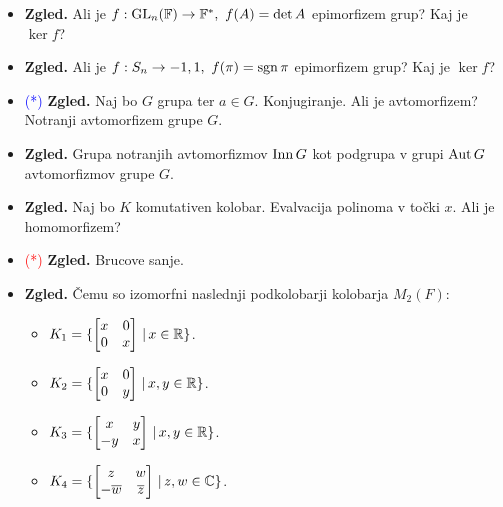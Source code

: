 \begin{enumerate}
\begin{itemize}
        \item \textbf{Zgled.} Ali je \(f: \operatorname{GL}_n(\mathbb{F}) \to \mathbb{F}^*, \ f(A) = \det A\) epimorfizem grup? Kaj je \(\ker f\)? 
        \item \textbf{Zgled.} Ali je \(f: S_n \to {-1, 1}, \ f(\pi) = \operatorname{sgn} \pi\) epimorfizem grup? Kaj je \(\ker f\)?
        \item \textcolor{blue}{(*)} \textbf{Zgled.} Naj bo \(G\) grupa ter \(a \in G\). Konjugiranje. Ali je avtomorfizem? Notranji avtomorfizem grupe \(G\).
        \item \textbf{Zgled.} Grupa notranjih avtomorfizmov \(\operatorname{Inn} G\) kot podgrupa v grupi \(\operatorname{Aut} G\) avtomorfizmov grupe \(G\). 
        \item \textbf{Zgled.} Naj bo \(K\) komutativen kolobar. Evalvacija polinoma v točki \(x\). Ali je homomorfizem?
        \item \textcolor{red}{(*)} \textbf{Zgled.} Brucove sanje.
        \item \textbf{Zgled.} Čemu so izomorfni naslednji podkolobarji kolobarja $M_2(F)$:
        \begin{itemize}
            \item $K_1 = \{\begin{bmatrix}
            x & 0 \\ 0 & x
            \end{bmatrix} \,|\, x \in \mathbb{R}\}$.
            \item $K_2 = \{\begin{bmatrix}
            x & 0 \\ 0 & y
            \end{bmatrix} \,|\, x,y \in \mathbb{R}\}$.
            \item $K_3 = \{\begin{bmatrix}
            x & y \\ -y & x
            \end{bmatrix} \,|\, x, y \in \mathbb{R}\}$.
            \item $K_4 = \{\begin{bmatrix}
            z & w \\ -\overline{w} & \overline{z}
            \end{bmatrix} \,|\, z, w \in \mathbb{C}\}$.
        \end{itemize}
    \end{itemize}
\end{enumerate}

\newpage

